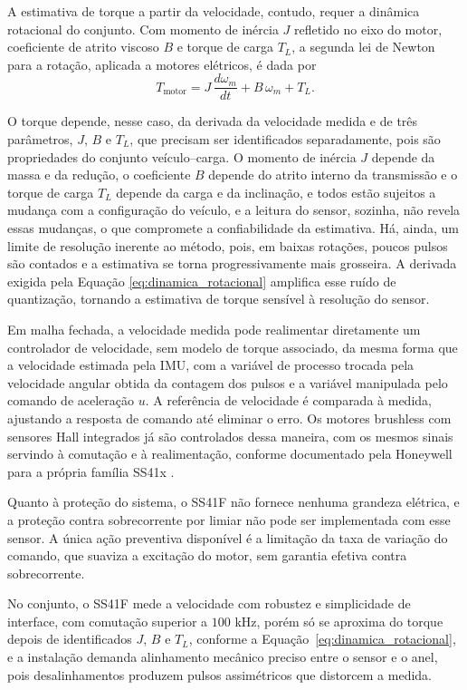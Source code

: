 A estimativa de torque a partir da velocidade, contudo, requer a dinâmica rotacional do conjunto. Com
momento de inércia $J$ refletido no eixo do motor, coeficiente de atrito viscoso $B$ e torque de
carga $T_L$, a segunda lei de Newton para a rotação, aplicada a motores elétricos, é dada por
\begin{equation}\label{eq:dinamica_rotacional}
T_{\text{motor}} = J\,\frac{d\omega_m}{dt} + B\,\omega_m + T_L.
\end{equation}

O torque depende, nesse caso, da derivada da velocidade medida e de três parâmetros, $J$, $B$ e $T_L$,
que precisam ser identificados separadamente, pois são propriedades do conjunto
veículo--carga. O momento de inércia $J$ depende da massa e da redução, o coeficiente
$B$ depende do atrito interno da
transmissão e o torque de carga $T_L$ depende da carga e da inclinação, e todos estão
sujeitos a mudança com a configuração do veículo, e a leitura do sensor, sozinha, não revela essas
mudanças, o que compromete a confiabilidade da estimativa. Há, ainda, um limite de resolução
inerente ao método, pois, em baixas rotações, poucos pulsos são contados e a estimativa se
torna progressivamente mais grosseira. A derivada exigida pela Equação
\eqref{eq:dinamica_rotacional} amplifica esse ruído de quantização, tornando a estimativa de
torque sensível à resolução do sensor.

Em malha fechada, a velocidade medida pode realimentar diretamente um controlador
de velocidade, sem modelo de torque associado, da mesma forma que a velocidade estimada
pela IMU, com a variável de processo trocada pela velocidade angular obtida da contagem dos
pulsos e a variável manipulada pelo comando de aceleração $u$. A referência de velocidade é
comparada à medida, ajustando a resposta de comando até eliminar o erro.
Os motores brushless com sensores Hall integrados já são
controlados dessa maneira, com os mesmos sinais servindo à comutação e à realimentação,
conforme documentado pela Honeywell para a própria família SS41x \cite{honeywell_bldc}.

Quanto à proteção do sistema, o SS41F não fornece nenhuma grandeza elétrica, e a
proteção contra sobrecorrente por limiar não pode ser implementada com esse sensor. A única
ação preventiva disponível é a limitação da taxa de variação do comando, que suaviza a
excitação do motor, sem garantia efetiva contra sobrecorrente.

No conjunto, o SS41F mede a velocidade com robustez e simplicidade de interface, com
comutação superior a $100$ kHz, porém só
se aproxima do torque depois de identificados $J$, $B$ e $T_L$, conforme a
Equação~\eqref{eq:dinamica_rotacional}, e a instalação demanda alinhamento mecânico
preciso entre o sensor e o anel, pois desalinhamentos produzem pulsos assimétricos que
distorcem a medida.

